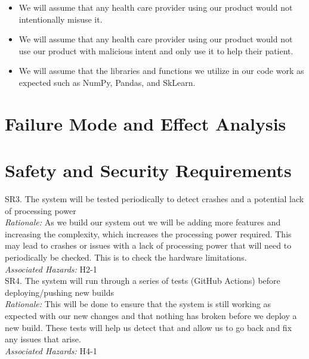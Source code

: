 \documentclass{article}
\begin{document}
\begin{itemize}
    \item We will assume that any health care provider using our product would not intentionally misuse it.
    \item We will assume that any health care provider using our product would not use our product with malicious intent and only use it to help their patient.
    \item We will assume that the libraries and functions we utilize in our code work as expected such as NumPy, Pandas, and SkLearn.
  \end{itemize}

  
\section{Failure Mode and Effect Analysis}


\section{Safety and Security Requirements}


SR3. The system will be tested periodically to detect crashes and a potential lack of processing power\\
    \indent \indent \emph{Rationale:} As we build our system out we will be adding more features and increasing the complexity, which increases the processing power required. This may lead to crashes or issues with a lack of processing power that will need to periodically be checked. This is to check the hardware limitations. \\
    \indent \indent \emph{Associated Hazards:} H2-1\\

 SR4. The system will run through a series of tests (GitHub Actions) before deploying/pushing new builds\\
    \indent \indent \emph{Rationale:} This will be done to ensure that the system is still working as expected with our new changes and that nothing has broken before we deploy a new build. These tests will help us detect that and allow us to go back and fix any issues that arise. \\
    \indent \indent \emph{Associated Hazards:} H4-1  \\
\end{document}
